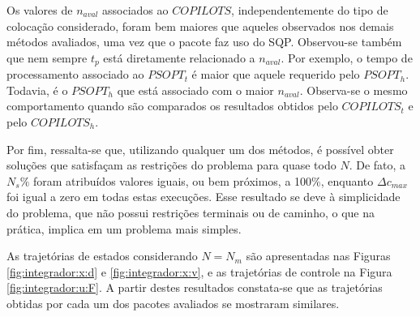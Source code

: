 Os valores de $ n_{aval} $ associados ao $ COPILOTS $, independentemente do tipo de colocação considerado, foram bem maiores que aqueles observados nos demais métodos avaliados, uma vez que o pacote faz uso do SQP. Observou-se também que nem sempre $ t_p $ está diretamente relacionado a $ n_{aval} $. Por exemplo, o tempo de processamento associado ao $ PSOPT_t $ é maior que aquele requerido pelo $ PSOPT_h $. Todavia, é o $ PSOPT_h $ que está associado com o maior $ n_{aval} $. Observa-se o mesmo comportamento quando são comparados os resultados obtidos pelo $ COPILOTS_t $ e pelo $ COPILOTS_h $. 

Por fim, ressalta-se que, utilizando qualquer um dos métodos, é possível obter soluções que satisfaçam as restrições do problema para quase todo $ N $. De fato, a $ N_s\% $ foram atribuídos valores iguais, ou bem próximos, a 100\%, enquanto $ \Delta c_{max} $ foi igual a  zero em todas estas execuções. Esse resultado se deve à simplicidade do problema, que não possui restrições terminais ou de caminho, o que na prática, implica em um problema mais simples. 

As trajetórias de estados considerando $ N = N_m $ são apresentadas nas Figuras \ref{fig:integrador:x:d} e \ref{fig:integrador:x:v}, e as trajetórias de controle na Figura \ref{fig:integrador:u:F}. A partir destes resultados constata-se que as trajetórias obtidas por cada um dos pacotes avaliados se mostraram similares. 

